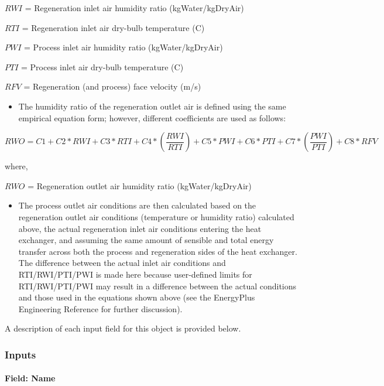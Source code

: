 \(RWI\) = Regeneration inlet air humidity ratio (kgWater/kgDryAir)

\(RTI\) = Regeneration inlet air dry-bulb temperature (C)

\(PWI\) = Process inlet air humidity ratio (kgWater/kgDryAir)

\(PTI\) = Process inlet air dry-bulb temperature (C)

\(RFV\) = Regeneration (and process) face velocity (m/s)

\begin{itemize}
\tightlist
\item
  The humidity ratio of the regeneration outlet air is defined using the same empirical equation form; however, different coefficients are used as follows:
\end{itemize}

\begin{equation}
RWO = C1 + C2*RWI + C3*RTI + C4*\left( {\frac{{RWI}}{{RTI}}} \right) + C5*PWI + C6*PTI + C7*\left( {\frac{{PWI}}{{PTI}}} \right) + C8*RFV
\end{equation}

where,

\(RWO\) = Regeneration outlet air humidity ratio (kgWater/kgDryAir)

\begin{itemize}
\tightlist
\item
  The process outlet air conditions are then calculated based on the regeneration outlet air conditions (temperature or humidity ratio) calculated above, the actual regeneration inlet air conditions entering the heat exchanger, and assuming the same amount of sensible and total energy transfer across both the process and regeneration sides of the heat exchanger. The difference between the actual inlet air conditions and RTI/RWI/PTI/PWI is made here because user-defined limits for RTI/RWI/PTI/PWI may result in a difference between the actual conditions and those used in the equations shown above (see the EnergyPlus Engineering Reference for further discussion).
\end{itemize}

A description of each input field for this object is provided below.

\subsubsection{Inputs}\label{inputs-3-016}

\paragraph{Field: Name}\label{field-name-3-014}

